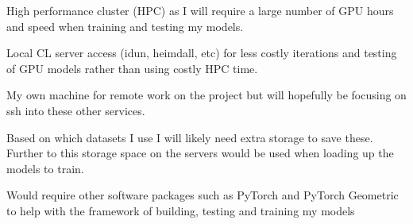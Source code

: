 \documentclass{article}
\begin{document}
High performance cluster (HPC) as I will require a large number of GPU hours and speed when training and testing my models. 

Local CL server access (idun, heimdall, etc) for less costly iterations and testing of GPU models rather than using costly HPC time.

My own machine for remote work on the project but will hopefully be focusing on ssh into these other services.

Based on which datasets I use I will likely need extra storage to save these. Further to this storage space on the servers would be used when loading up the models to train.

Would require other software packages such as PyTorch and PyTorch Geometric to help with the framework of building, testing and training my models
\end{document}
